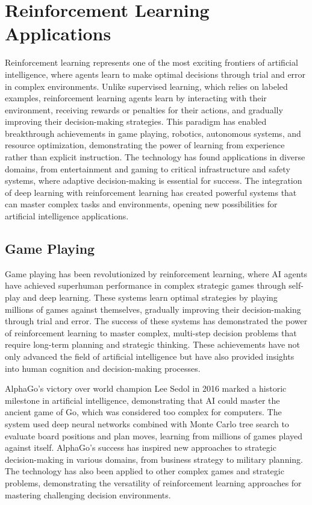 
\section{Reinforcement Learning Applications }
\label{sec:rl-applications}

Reinforcement learning represents one of the most exciting frontiers of artificial intelligence, where agents learn to make optimal decisions through trial and error in complex environments. Unlike supervised learning, which relies on labeled examples, reinforcement learning agents learn by interacting with their environment, receiving rewards or penalties for their actions, and gradually improving their decision-making strategies. This paradigm has enabled breakthrough achievements in game playing, robotics, autonomous systems, and resource optimization, demonstrating the power of learning from experience rather than explicit instruction. The technology has found applications in diverse domains, from entertainment and gaming to critical infrastructure and safety systems, where adaptive decision-making is essential for success. The integration of deep learning with reinforcement learning has created powerful systems that can master complex tasks and environments, opening new possibilities for artificial intelligence applications.

\subsection{Game Playing}

Game playing has been revolutionized by reinforcement learning, where AI agents have achieved superhuman performance in complex strategic games through self-play and deep learning. These systems learn optimal strategies by playing millions of games against themselves, gradually improving their decision-making through trial and error. The success of these systems has demonstrated the power of reinforcement learning to master complex, multi-step decision problems that require long-term planning and strategic thinking. These achievements have not only advanced the field of artificial intelligence but have also provided insights into human cognition and decision-making processes.

AlphaGo's victory over world champion Lee Sedol in 2016 marked a historic milestone in artificial intelligence, demonstrating that AI could master the ancient game of Go, which was considered too complex for computers. The system used deep neural networks combined with Monte Carlo tree search to evaluate board positions and plan moves, learning from millions of games played against itself. AlphaGo's success has inspired new approaches to strategic decision-making in various domains, from business strategy to military planning. The technology has also been applied to other complex games and strategic problems, demonstrating the versatility of reinforcement learning approaches for mastering challenging decision environments.


